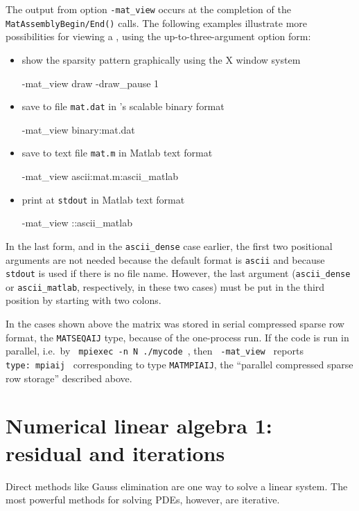 The output from option \texttt{-mat\_view} occurs at the completion of the \texttt{MatAssemblyBegin/End()} calls.  The following examples illustrate more possibilities for viewing a \pMat, using the up-to-three-argument option form:\begin{itemize}
\item show the sparsity pattern graphically using the X window system
\begin{codeplain}
-mat_view draw -draw_pause 1
\end{codeplain}
\item save to file \texttt{mat.dat} in \PETSc's scalable binary format
\begin{codeplain}
-mat_view binary:mat.dat
\end{codeplain}
\item save to text file \texttt{mat.m} in Matlab text format
\begin{codeplain}
-mat_view ascii:mat.m:ascii_matlab
\end{codeplain}
\item print at \texttt{stdout} in Matlab text format
\begin{codeplain}
-mat_view ::ascii_matlab
\end{codeplain}
\end{itemize}
In the last form, and in the \texttt{ascii\_dense} case earlier, the first two positional arguments are not needed because the default format is \texttt{ascii} and because \texttt{stdout} is used if there is no file name.  However, the last argument (\texttt{ascii\_dense} or \texttt{ascii\_matlab}, respectively, in these two cases) must be put in the third position by starting with two colons.

In the cases shown above the matrix was stored in serial compressed sparse row format, the \texttt{MATSEQAIJ} type, because of the one-process run.  If the code is run in parallel, i.e.~by \texttt{ mpiexec -n N ./mycode }, then \texttt{ -mat\_view }  reports \texttt{ type:~mpiaij } corresponding to \pMat type \texttt{MATMPIAIJ}, the ``parallel compressed sparse row storage'' described above.


\section{Numerical linear algebra 1: residual and iterations}

Direct methods like Gauss elimination \citep{TrefethenBau1997} are one way to solve a linear system.  The most powerful methods for solving PDEs, however, are iterative.

